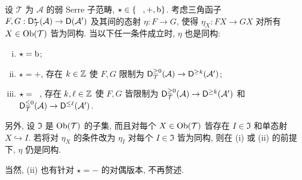 \begin{proposition}\label{prop:wayout}
	设 $\mathcal{T}$ 为 $\mathcal{A}$ 的弱 Serre 子范畴, $\star \in \{\hspace{0.8em}, +, \mathrm{b}\}$. 考虑三角函子 $F, G: \mathsf{D}^{\star}_{\mathcal{T}}(\mathcal{A}) \to \mathsf{D}(\mathcal{A}')$ 及其间的态射 $\eta: F \to G$, 使得 $\eta_X: FX \to GX$ 对所有 $X \in \operatorname{Ob}(\mathcal{T})$ 皆为同构. 当以下任一条件成立时, $\eta$ 也是同构:
	\begin{enumerate}[(i)]
		\item $\star = \mathrm{b}$;
		\item $\star = +$, 存在 $k \in \mathbb{Z}$ 使 $F, G$ 限制为 $\mathsf{D}^{\geq 0}_{\mathcal{T}}(\mathcal{A}) \to \mathsf{D}^{\geq k}(\mathcal{A}')$;
		\item $\star = \hspace{0.8em}$, 存在 $k, \ell \in \mathbb{Z}$ 使 $F, G$ 皆限制为 $\mathsf{D}^{\geq 0}_{\mathcal{T}}(\mathcal{A}) \to \mathsf{D}^{\geq k}(\mathcal{A}')$ 和 $\mathsf{D}^{\leq 0}_{\mathcal{T}}(\mathcal{A}) \to \mathsf{D}^{\leq \ell}(\mathcal{A}')$.
	\end{enumerate}

	另外, 设 $\mathfrak{I}$ 是 $\operatorname{Ob}(\mathcal{T})$ 的子集, 而且对每个 $X \in \operatorname{Ob}(\mathcal{T})$ 皆存在 $I \in \mathfrak{I}$ 和单态射 $X \hookrightarrow I$. 若将对 $\eta_X$ 的条件改为 $\eta_I$ 对每个 $I \in \mathfrak{I}$ 皆为同构, 则在 (i) 或 (ii) 的前提下, $\eta$ 仍是同构.
	
	当然, (ii) 也有针对 $\star = -$ 的对偶版本, 不再赘述.
\end{proposition}
